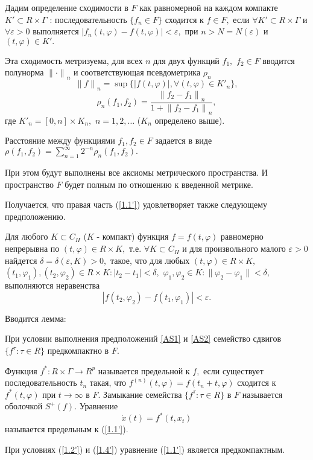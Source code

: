 	Дадим определение сходимости в $F$ как равномерной на каждом компакте
	$K'\subset R\times \Gamma $ : последовательность
	$\{f_n\in F\}$ сходится к $f\in F,$ если $\forall K'\subset
	R\times\Gamma $ и $\forall \varepsilon >0$ выполняется $|f_n(t,\varphi
	)-f(t,\varphi )|<\varepsilon,$ при $n>N=N(\varepsilon )$ и
	$(t,\varphi )\in K'.$
	
	Эта сходимость метризуема, для всех $n$ для двух функций $f_1,$
	$f_2\in F$ вводится полунорма ${\|\cdot \|}_n$ и соответствующая
	псевдометрика $\rho _n$  $${\| f\|
	}_n=\sup{\{|f(t,\varphi )|, \forall (t,\varphi )\in {K'}_n\} },$$
	$$\rho _n(f_1,f_2)=\frac{{\| f_2-f_1\| }_n}{1+{\| f_2-f_1\|
		}_n},$$ \noindent где ${K'}_n=[0,n]\times K_n,$ $n=1,2,\ldots $
	($K_n$ определено выше).
	
	Расстояние между функциями $f_1, f_2\in F$ задается в виде
	$\rho (f_1,f_2)=\sum_{n=1}^{\infty }{2^{-n}\rho _n(f_1,f_2)}.
	\label{1.3'}$
	
	При этом будут выполнены все аксиомы
	метрического пространства. И пространство
	$F$ будет полным по отношению к введенной метрике.
	
	Получается,  что правая  часть   (\ref{1.1'})   удовлетворяет   также
	следующему предположению.
	
	\begin{definition}\label{AS2} Для любого $K\subset C_H$ ($K$ - компакт)
		функция $f=f(t,\varphi )$ равномерно непрерывна по
		$(t, \varphi )\in R\times K,$ т.е. $\forall K\subset C_H$ и для произвольного малого $\varepsilon
		>0$ найдется $\delta =\delta (\varepsilon ,K)>0,$ такое, что для
		любых $(t,\varphi)\in R\times K,$ $(t_1,\varphi _1),
		(t_2,\varphi _2)\in R\times K: |t_2-t_1|<\delta,$ $\varphi _1,
		\varphi _2\in K:\|\varphi _2-\varphi _1\|<\delta,$ выполняются
		неравенства
		\begin{equation}
		|f(t_2,\varphi _2)-f(t_1,\varphi
		_1)|<\varepsilon. \label{1.4'}
		\end{equation}
	\end{definition}
	
	Вводится лемма:
	
	\begin{lemma}\label{l-1.3} При условии выполнения предположений \ref{AS1} и \ref{AS2}
		семейство сдвигов $\{f^{\tau }:\tau\in R\}$
		предкомпактно в $F.$
	\end{lemma}
	
	\begin{definition}\label{d-1.1} Функция $f^*:R\times\Gamma \to R^p$ называется предельной
		к $f,$ если существует  последовательность ${t_n}$
		такая,  что ${f^{(n)}(t,\varphi )=f(t_n+t,\varphi )}$ сходится к
		$f^*(t,\varphi )$ при $t \to \infty$ в $F.$ Замыкание семейства $\{f^{\tau }:\tau \in
		R\}$ в $F$ называется оболочкой $S^+(f).$ Уравнение
		\begin{equation}
		\dot x(t)=f^*(t,x_t) \label{1.5'}
		\end{equation}
		называется предельным к (\ref{1.1'}).
	\end{definition}
	При  условиях (\ref{1.2'}) и (\ref{1.4'})
	уравнение  (\ref{1.1'}) является предкомпактным.
	
